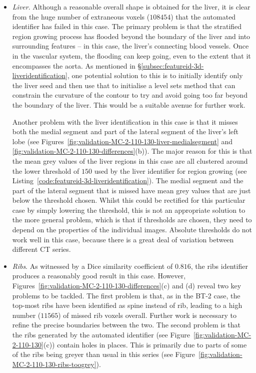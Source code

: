 \begin{itemize}
\item \emph{Liver}. Although a reasonable overall shape is obtained for the liver, it is clear from the huge number of extraneous voxels ($108454$) that the automated identifier has failed in this case. The primary problem is that the stratified region growing process has flooded beyond the boundary of the liver and into surrounding features -- in this case, the liver's connecting blood vessels. Once in the vascular system, the flooding can keep going, even to the extent that it encompasses the aorta. As mentioned in \S\ref{subsec:featureid-3d-liveridentification}, one potential solution to this is to initially identify only the liver seed and then use that to initialise a level sets method that can constrain the curvature of the contour to try and avoid going too far beyond the boundary of the liver. This would be a suitable avenue for further work.

Another problem with the liver identification in this case is that it misses both the medial segment and part of the lateral segment of the liver's left lobe (see Figures~\ref{fig:validation-MC-2-110-130-liver-medialsegment} and \ref{fig:validation-MC-2-110-130-differences}(b)). The major reason for this is that the mean grey values of the liver regions in this case are all clustered around the lower threshold of $150$ used by the liver identifier for region growing (see Listing~\ref{code:featureid-3d-liveridentification}). The medial segment and the part of the lateral segment that is missed have mean grey values that are just below the threshold chosen. Whilst this could be rectified for this particular case by simply lowering the threshold, this is not an appropriate solution to the more general problem, which is that if thresholds are chosen, they need to depend on the properties of the individual images. Absolute thresholds do not work well in this case, because there is a great deal of variation between different CT series.

\item \emph{Ribs}. As witnessed by a Dice similarity coefficient of $0.816$, the ribs identifier produces a reasonably good result in this case. However, Figures~\ref{fig:validation-MC-2-110-130-differences}(c) and (d) reveal two key problems to be tackled. The first problem is that, as in the BT-2 case, the top-most ribs have been identified as spine instead of rib, leading to a high number ($11565$) of missed rib voxels overall. Further work is necessary to refine the precise boundaries between the two. The second problem is that the ribs generated by the automated identifier (see Figure~\ref{fig:validation-MC-2-110-130}(c)) contain holes in places. This is primarily due to parts of some of the ribs being greyer than usual in this series (see Figure~\ref{fig:validation-MC-2-110-130-ribs-toogrey}).


\end{itemize}
